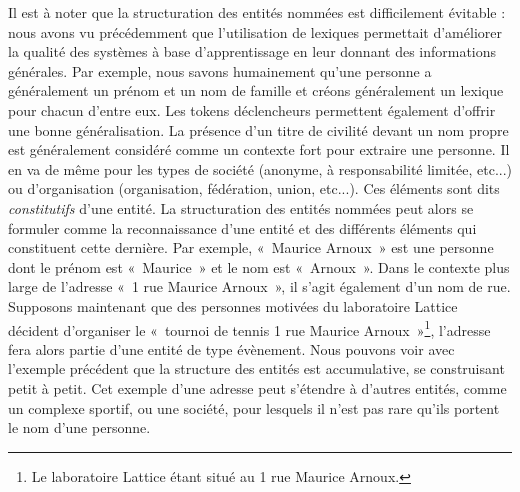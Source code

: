 \documentclass[PhD-Yoann-Dupont.tex]{subfiles}
\begin{document}
Il est à noter que la structuration des entités nommées est difficilement évitable : nous avons vu précédemment que l'utilisation de lexiques permettait d'améliorer la qualité des systèmes à base d'apprentissage en leur donnant des informations générales. Par exemple, nous savons humainement qu'une personne a généralement un prénom et un nom de famille et créons généralement un lexique pour chacun d'entre eux. Les tokens déclencheurs permettent également d'offrir une bonne généralisation. La présence d'un titre de civilité devant un nom propre est généralement considéré comme un contexte fort pour extraire une personne. Il en va de même pour les types de société (anonyme, à responsabilité limitée, etc...) ou d'organisation (organisation, fédération, union, etc...). Ces éléments sont dits \emph{constitutifs} d'une entité. La structuration des entités nommées peut alors se formuler comme la reconnaissance d'une entité et des différents éléments qui constituent cette dernière. Par exemple, «\ Maurice Arnoux\ » est une personne dont le prénom est «\ Maurice\ » et le nom est «\ Arnoux\ ». Dans le contexte plus large de l'adresse «\ 1 rue Maurice Arnoux\ », il s'agit également d'un nom de rue. Supposons maintenant que des personnes motivées du laboratoire Lattice décident d'organiser le «\ tournoi de tennis 1 rue Maurice Arnoux\ »\footnote{Le laboratoire Lattice étant situé au 1 rue Maurice Arnoux.}, l'adresse fera alors partie d'une entité de type évènement. Nous pouvons voir avec l'exemple précédent que la structure des entités est accumulative, se construisant petit à petit. Cet exemple d'une adresse peut s'étendre à d'autres entités, comme un complexe sportif, ou une société, pour lesquels il n'est pas rare qu'ils portent le nom d'une personne.
\end{document}
